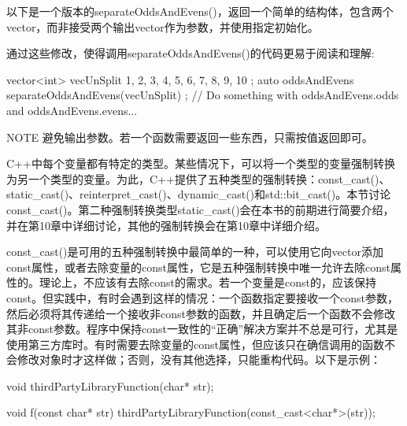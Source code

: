 以下是一个版本的separateOddsAndEvens()，返回一个简单的结构体，包含两个vector，而非接受两个输出vector作为参数，并使用指定初始化。


通过这些修改，使得调用separateOddsAndEvens()的代码更易于阅读和理解:

\begin{cpp}
vector<int> vecUnSplit { 1, 2, 3, 4, 5, 6, 7, 8, 9, 10 };
auto oddsAndEvens { separateOddsAndEvens(vecUnSplit) };
// Do something with oddsAndEvens.odds and oddsAndEvens.evens...
\end{cpp}

\begin{myNotic}{NOTE}
避免输出参数。若一个函数需要返回一些东西，只需按值返回即可。
\end{myNotic}


C++中每个变量都有特定的类型。某些情况下，可以将一个类型的变量强制转换为另一个类型的变量。为此，C++提供了五种类型的强制转换：const\_cast()、static\_cast()、reinterpret\_cast()、dynamic\_cast()和std::bit\_cast()。本节讨论const\_cast()。第二种强制转换类型static\_cast()会在本书的前期进行简要介绍，并在第10章中详细讨论，其他的强制转换会在第10章中详细介绍。

const\_cast()是可用的五种强制转换中最简单的一种，可以使用它向vector添加const属性，或者去除变量的const属性，它是五种强制转换中唯一允许去除const属性的。理论上，不应该有去除const的需求。若一个变量是const的，应该保持const。但实践中，有时会遇到这样的情况：一个函数指定要接收一个const参数，然后必须将其传递给一个接收非const参数的函数，并且确定后一个函数不会修改其非const参数。程序中保持const一致性的“正确”解决方案并不总是可行，尤其是使用第三方库时。有时需要去除变量的const属性，但应该只在确信调用的函数不会修改对象时才这样做；否则，没有其他选择，只能重构代码。以下是示例：

\begin{cpp}
void thirdPartyLibraryFunction(char* str);

void f(const char* str)
{
    thirdPartyLibraryFunction(const_cast<char*>(str));
}
\end{cpp}

